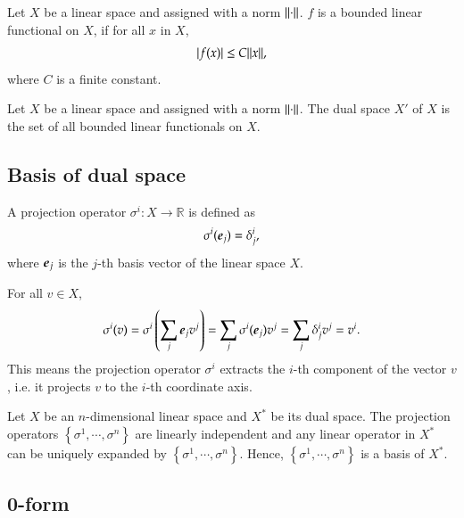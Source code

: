 \documentclass[11pt, a4paper]{book}
\begin{document}
\begin{Definition}
  \label{def:bounded-linear-functional}
  Let $X$ be a linear space and assigned with a norm $\lVert\cdot\rVert$. $f$ is a bounded
  linear functional on $X$, if for all $x$ in $X$,
  $$
  \lvert f(x)\rvert \leq C \lVert x\rVert,
  $$
  where $C$ is a finite constant.
\end{Definition}

\begin{Definition}
  Let $X$ be a linear space and assigned with a norm $\lVert\cdot\rVert$. The dual space $X'$
  of $X$ is the set of all bounded linear functionals on $X$.
\end{Definition}

\subsection{Basis of dual space}

\begin{Definition}
  A projection operator $\sigma^i: X \rightarrow \mathbb{R}$ is defined as
  \begin{equation}
    \label{eq:projection-operator}
    \sigma^i(\boldsymbol{e}_j) = \delta^i_j,
  \end{equation}
  where $\boldsymbol{e}_j$ is the $j$-th basis vector of the linear space $X$.
\end{Definition}

For all $v\in X$,
\begin{equation*}
  \sigma^i(v) = \sigma^{i}\left( \sum_j\boldsymbol{e}_jv^j \right) = \sum_j
  \sigma^i(\boldsymbol{e}_j) v^j = \sum_j\delta^i_j v^j = v^i.
\end{equation*}
This means the projection operator $\sigma^i$ extracts the $i$-th component of the
vector $v$, i.e. it projects $v$ to the $i$-th coordinate axis.

\begin{Proposition}
  Let $X$ be an $n$-dimensional linear space and $X^{*}$ be its dual space. The projection
  operators $\left\{ \sigma^1,\cdots,\sigma^n \right\}$ are linearly independent and any
  linear operator in $X^{*}$ can be uniquely expanded by $\left\{ \sigma^1,\cdots,\sigma^n
  \right\}$. Hence, $\left\{ \sigma^1,\cdots,\sigma^n \right\}$ is a basis of $X^{*}$.
\end{Proposition}

\subsection{0-form}
\label{sec:0-form}
\end{document}
